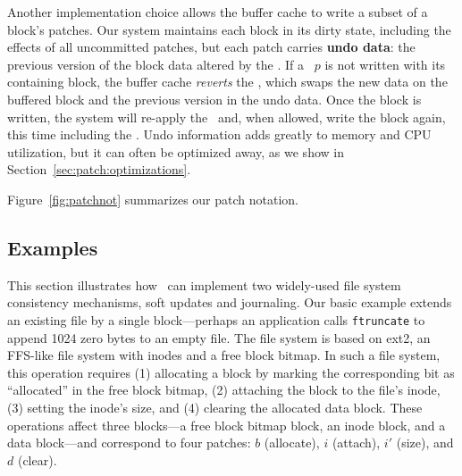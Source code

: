 Another implementation choice allows the buffer cache to
 write a subset of a block's patches.
%
Our system maintains each block in its dirty state, including the
 effects of all uncommitted patches, but
%
each patch carries \textbf{undo data}: the 
 previous version of the block data altered by the \patch.
%
If a \patch\ $p$ is not written with its containing block, the buffer cache
 \emph{reverts} the \patch, which swaps the new data on the buffered block
 and the previous version in the undo data.
%
Once the block is written, the system will re-apply the \patch\ and, when
 allowed, write the block again, this time including the \patch.
%
Undo information adds greatly to memory and CPU utilization, but it can
 often be optimized away, as we show in Section~\ref{sec:patch:optimizations}.

Figure~\ref{fig:patchnot} summarizes our patch notation.

\label{sec:patch:dependencies}

\begin{comment}
\paragraph{Example}
%
Suppose a \Kudos\ system contains the \patches\ in Figure~\ref{f:ex}c,
where the journal entry patches $d_\textrm{J}$, $i_\textrm{J}$, and
 $b_\textrm{J}$ have committed and all other patches have not.
%
The buffer cache cannot write blocks $\PBlock{b}$, $\PBlock{i}$, or $\PBlock{d}$,
since $\{b$, $i$, $i'$, $d\} \PDDepend \PXcmt$ and $\PXcmt \not\in \PDisk$.
%
Its only option is to write $\PBlock{\PXcmt}$ with $P = \{\PXcmt\}$, since
 $\PDepset{\PXcmt} = \{d_\textrm{J}$, $i_\textrm{J}$, $b_\textrm{J}\}
 \subseteq \PDisk$.
%
Since $\PXcmp$ has unmet dependencies on other blocks, it must be undone
 before the write and is excluded from $P$.
%
Later, when $\PXcmt$ commits, the buffer cache has the option to
write any of $\PBlock{b}$, $\PBlock{i}$, or $\PBlock{d}$.
\end{comment}


\subsection{Examples}
\label{sec:patch:examples}

This section illustrates how \patches\ can implement two widely-used
 file system consistency mechanisms, soft updates and journaling.
%
Our basic example extends an existing file by a single block---perhaps an
 application calls \texttt{ftruncate} to append 1024 zero bytes to an
 empty file.
%
The file system is based on ext2, an FFS-like file system with inodes and
 a free block bitmap.
%
In such a file system, this operation requires (1) allocating a block by
 marking the corresponding bit as ``allocated'' in the free block bitmap,
 (2) attaching the block to the file's inode, (3) setting the inode's size,
 and (4) clearing the allocated data block.
%
These operations affect three blocks---a free block bitmap block, an inode
 block, and a data block---and correspond to four patches: $b$ (allocate),
 $i$ (attach), $i'$ (size), and $d$ (clear).


